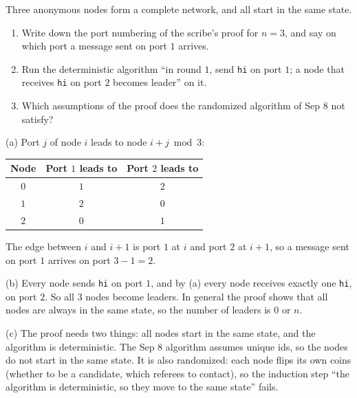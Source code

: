 \begin{exercisebox}
\begin{pproblem}[The symmetry argument for $n = 3$]\label{wp:anon3}
    Three anonymous nodes form a complete network, and all start in the same state.
    \begin{enumerate}[label=(\alph*)]
        \item Write down the port numbering of the scribe's proof for $n = 3$, and say on which port
              a message sent on port $1$ arrives.
        \item Run the deterministic algorithm ``in round $1$, send \texttt{hi} on port $1$; a node
              that receives \texttt{hi} on port $2$ becomes leader'' on it.
        \item Which assumptions of the proof does the randomized algorithm of Sep 8 not satisfy?
    \end{enumerate}
\end{pproblem}
\tcblower
\begin{wsolution}
    (a) Port $j$ of node $i$ leads to node $i + j \bmod 3$:
    \begin{center}
        \begin{tabular}{ccc}
            \toprule
            Node & Port $1$ leads to & Port $2$ leads to \\ \midrule
            $0$  & $1$               & $2$               \\
            $1$  & $2$               & $0$               \\
            $2$  & $0$               & $1$               \\ \bottomrule
        \end{tabular}
    \end{center}
    The edge between $i$ and $i + 1$ is port $1$ at $i$ and port $2$ at $i + 1$, so a message sent
    on port $1$ arrives on port $3 - 1 = 2$.

    (b) Every node sends \texttt{hi} on port $1$, and by (a) every node receives exactly one
    \texttt{hi}, on port $2$. So all $3$ nodes become leaders. In general the proof shows that all
    nodes are always in the same state, so the number of leaders is $0$ or $n$.

    (c) The proof needs two things: all nodes start in the same state, and the algorithm is
    deterministic. The Sep 8 algorithm assumes unique ids, so the nodes do not start in the same
    state. It is also randomized: each node flips its own coins (whether to be a candidate, which
    referees to contact), so the induction step ``the algorithm is deterministic, so they move to
    the same state'' fails.
\end{wsolution}
\end{exercisebox}

